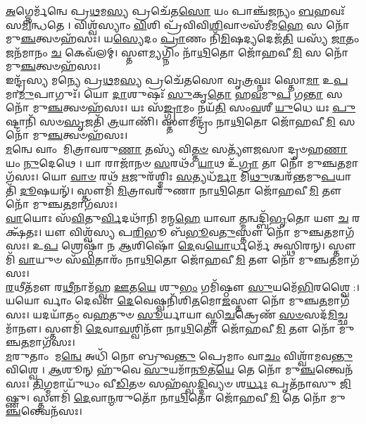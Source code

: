 \-\ul{𑌅}\-𑌗𑍍𑌨𑍇𑌰𑍍𑌮᳴𑌨𑍍𑌵𑍇 𑌪𑍍𑌰\-\ul{𑌥}\-𑌮\-\ul{𑌸𑍍𑌯} 𑌪𑍍𑌰𑌚𑍇᳴𑌤\-\ul{𑌸𑍋} 𑌯𑌂 𑌪𑌾𑌞𑍍𑌚᳴𑌜𑌨𑍍𑌯𑌂 \ul{𑌬}\-𑌹𑌵𑌃᳴ 𑌸\-\ul{𑌮𑌿}\-𑌨𑍍𑌧𑌤𑍇। 𑌵𑌿𑌶𑍍𑌵᳴𑌸𑍍𑌯𑌾𑌂 \ul{𑌵𑌿}\-𑌶𑌿 𑌪𑍍𑌰᳴𑌵𑌿𑌵𑌿\-\ul{𑌶𑌿}\-𑌵𑌾𑍞𑌸᳴𑌮𑍀𑌮\-\ul{𑌹𑍇} 𑌸 𑌨𑍋᳴ 𑌮𑍁\-\ul{𑌞𑍍𑌚}\-𑌤𑍍𑌵𑍞𑌹᳴𑌸𑌃। 𑌯\-\ul{𑌸𑍍𑌯𑍇}\-𑌦𑌂 \ul{𑌪𑍍𑌰𑌾}\-𑌣𑌂 𑌨𑌿᳴\-\ul{𑌮𑌿}\-𑌷𑌦𑍍𑌯𑌦𑍇𑌜᳴\-\ul{𑌤𑌿} 𑌯𑌸𑍍𑌯᳴ \ul{𑌜𑌾}\-𑌤𑌂 𑌜𑌨᳴𑌮𑌾𑌨𑌂 \ul{𑌚} 𑌕𑍇𑌵᳴𑌲𑌮𑍍। 𑌸𑍍𑌤𑍗\-\ul{𑌮𑍍𑌯}\-𑌗𑍍𑌨𑌿𑌂 𑌨𑌾᳴\-\ul{𑌥𑌿}\-𑌤𑍋 𑌜𑍋᳴𑌹𑌵𑍀\-\ul{𑌮𑌿} 𑌸 𑌨𑍋᳴ 𑌮𑍁\-\ul{𑌞𑍍𑌚}\-𑌤𑍍𑌵𑍞𑌹᳴𑌸𑌃।\\
𑌇𑌨𑍍𑌦𑍍𑌰᳴𑌸𑍍𑌯 𑌮𑌨𑍍𑌯𑍇 𑌪𑍍𑌰\-\ul{𑌥}\-𑌮\-\ul{𑌸𑍍𑌯} 𑌪𑍍𑌰𑌚𑍇᳴𑌤𑌸𑍋 𑌵𑍃\-\ul{𑌤𑍍𑌰}\-𑌘𑍍𑌨𑌃 𑌸𑍍𑌤𑍋\-\ul{𑌮𑌾} 𑌉\-\ul{𑌪} 𑌮𑌾\-\ul{𑌮𑍁}\-𑌪𑌾𑌗𑍁𑌃᳴। 𑌯𑍋 \ul{𑌦𑌾}\-𑌶𑍁𑌷𑌃᳴ \ul{𑌸𑍁}\-𑌕𑍃\-\ul{𑌤𑍋} 𑌹\-\ul{𑌵}\-𑌮𑍁\-\ul{𑌪} 𑌗\-\ul{𑌨𑍍𑌤𑌾} 𑌸 𑌨𑍋᳴ 𑌮𑍁\-\ul{𑌞𑍍𑌚}\-𑌤𑍍𑌵𑍞𑌹᳴𑌸𑌃। 𑌯𑌃 𑌸᳴\-\ul{𑌙𑍍𑌗𑍍𑌰𑌾}\-𑌮𑌂 𑌨𑌯᳴\-\ul{𑌤𑌿} 𑌸𑌂\-\ul{𑌵}\-𑌶𑍀 \ul{𑌯𑍁}\-𑌧𑍇 𑌯𑌃 \ul{𑌪𑍁}\-𑌷𑍍𑌟𑌾𑌨𑌿᳴ 𑌸𑍞\-\ul{𑌸𑍃}\-𑌜𑌤𑌿᳴ \ul{𑌤𑍍𑌰}\-𑌯𑌾𑌣𑌿᳴। 𑌸𑍍𑌤𑍗𑌮𑍀𑌨𑍍𑌦𑍍𑌰𑌂᳴ 𑌨𑌾\-\ul{𑌥𑌿}\-𑌤𑍋 𑌜𑍋᳴𑌹𑌵𑍀\-\ul{𑌮𑌿} 𑌸 𑌨𑍋᳴ 𑌮𑍁\-\ul{𑌞𑍍𑌚}\-𑌤𑍍𑌵𑍞𑌹᳴𑌸𑌃।\\
\-\ul{𑌮}\-𑌨𑍍𑌵𑍇 𑌵𑌾𑌂 𑌮𑌿𑌤𑍍𑌰𑌾𑌵𑌰𑍁\-\ul{𑌣𑌾} 𑌤𑌸𑍍𑌯᳴ 𑌵𑌿\-\ul{𑌤𑍍𑌤}\-\-\ul{𑍞} 𑌸𑌤𑍍𑌯𑍗᳴𑌜𑌸𑌾 𑌦𑍃𑍞𑌹\-\ul{𑌣𑌾} 𑌯𑌂 \ul{𑌨𑍁}\-𑌦𑍇𑌥𑍇। 𑌯𑌾 𑌰𑌾𑌜𑌾᳴𑌨𑍞 \ul{𑌸}\-𑌰𑌥𑌂᳴ \ul{𑌯𑌾}\-𑌥 𑌉᳴\-\ul{𑌗𑍍𑌰𑌾} 𑌤𑌾 𑌨𑍋᳴ 𑌮𑍁𑌞𑍍𑌚\-\ul{𑌤}\-𑌮𑌾𑌗᳴𑌸𑌃। 𑌯𑍋 \ul{𑌵𑌾}\-\-\ul{𑍞} 𑌰𑌥᳴ \ul{𑌋}\-𑌜𑍁𑌰᳴𑌶𑍍𑌮𑌿𑌃 \ul{𑌸}\-𑌤𑍍𑌯𑌧᳴\-\ul{𑌰𑍍𑌮𑌾} 𑌮𑌿\-\ul{𑌥𑍁}\-𑌶𑍍𑌚𑌰᳴𑌨𑍍𑌤𑌮𑍁\-\ul{𑌪}\-𑌯𑌾𑌤𑌿᳴ \ul{𑌦𑍂}\-𑌷𑌯𑌨𑍍᳴। 𑌸𑍍𑌤𑍗𑌮𑌿᳴ \ul{𑌮𑌿}\-𑌤𑍍𑌰𑌾𑌵𑌰𑍁᳴𑌣𑌾 𑌨𑌾\-\ul{𑌥𑌿}\-𑌤𑍋 𑌜𑍋᳴𑌹𑌵𑍀\-\ul{𑌮𑌿} 𑌤𑍗 𑌨𑍋᳴ 𑌮𑍁𑌞𑍍𑌚\-\ul{𑌤}\-𑌮𑌾𑌗᳴𑌸𑌃।\\
\-\ul{𑌵𑌾}\-𑌯𑍋𑌃 𑌸᳴\-\ul{𑌵𑌿}\-𑌤𑍁\-\ul{𑌰𑍍𑌵𑌿}\-𑌦𑌥𑌾᳴𑌨𑌿 𑌮𑌨𑍍𑌮\-\ul{𑌹𑍇} 𑌯𑌾𑌵𑌾\-\ul{𑌤𑍍𑌮}\-𑌨𑍍𑌵𑌦𑍍𑌬𑌿᳴\-\ul{𑌭𑍃}\-𑌤𑍋 𑌯𑍗 \ul{𑌚} 𑌰𑌕𑍍𑌷᳴𑌤𑌃। 𑌯𑍗 𑌵𑌿𑌶𑍍𑌵᳴𑌸𑍍𑌯 𑌪\-\ul{𑌰𑌿}\-𑌭𑍂 𑌬᳴\-\ul{𑌭𑍂}\-𑌵\-\ul{𑌤𑍁}\-𑌸𑍍𑌤𑍗 𑌨𑍋᳴ 𑌮𑍁𑌞𑍍𑌚\-\ul{𑌤}\-𑌮𑌾𑌗᳴𑌸𑌃। 𑌉\-\ul{𑌪} 𑌶𑍍𑌰𑍇𑌷𑍍𑌠𑌾᳴ 𑌨 \ul{𑌆}\-𑌶𑌿𑌷𑍋᳴ \ul{𑌦𑍇}\-𑌵\-\ul{𑌯𑍋}\-𑌰𑍍𑌧𑌰𑍍𑌮𑍇᳴ 𑌅𑌸𑍍𑌥𑌿𑌰𑌨𑍍। 𑌸𑍍𑌤𑍗𑌮𑌿᳴ \ul{𑌵𑌾}\-𑌯𑍁𑍞 𑌸᳴\-\ul{𑌵𑌿}\-𑌤𑌾𑌰𑌂᳴ 𑌨𑌾\-\ul{𑌥𑌿}\-𑌤𑍋 𑌜𑍋᳴𑌹𑌵𑍀\-\ul{𑌮𑌿} 𑌤𑍗 𑌨𑍋᳴ 𑌮𑍁𑌞𑍍𑌚\-\ul{𑌤}\-𑌮𑌾𑌗᳴𑌸𑌃।\\
\-\ul{𑌰}\-𑌥𑍀𑌤᳴𑌮𑍗 𑌰\-\ul{𑌥𑍀}\-𑌨𑌾𑌮᳴𑌹𑍍𑌵 \ul{𑌊}\-𑌤\-\ul{𑌯𑍇} 𑌶𑍁\-\ul{𑌭𑌂} 𑌗𑌮𑌿᳴𑌷𑍍𑌠𑍗 \ul{𑌸𑍁}\-𑌯𑌮𑍇᳴\-\ul{𑌭𑌿}\-𑌰𑌶𑍍𑌵𑍈:। 𑌯𑌯𑍋𑌰𑍍𑌵𑌾𑌂 𑌦𑍇𑌵𑍗 \ul{𑌦𑍇}\-𑌵𑍇𑌷𑍍𑌵𑌨𑌿᳴𑌶𑌿\-\ul{𑌤}\-𑌮𑍋\-\ul{𑌜}\-𑌸𑍍𑌤𑍗 𑌨𑍋᳴ 𑌮𑍁𑌞𑍍𑌚\-\ul{𑌤}\-𑌮𑌾𑌗᳴𑌸𑌃। 𑌯𑌦𑌯𑌾᳴𑌤𑌂 𑌵\-\ul{𑌹}\-𑌤𑍁𑍞 \ul{𑌸𑍂}\-𑌰𑍍𑌯𑌾𑌯𑌾𑌸𑍍𑌤𑍍𑌰𑌿\-\ul{𑌚}\-𑌕𑍍𑌰𑍇𑌣᳴ \ul{𑌸}\-\-\ul{𑍞}\-𑌸𑌦᳴\-\ul{𑌮𑌿}\-𑌚𑍍𑌛𑌮𑌾᳴𑌨𑍗। 𑌸𑍍𑌤𑍗𑌮𑌿᳴ \ul{𑌦𑍇}\-𑌵𑌾\-\ul{𑌵}\-𑌶𑍍𑌵𑌿𑌨𑍗᳴ 𑌨𑌾\-\ul{𑌥𑌿}\-𑌤𑍋 𑌜𑍋᳴𑌹𑌵𑍀\-\ul{𑌮𑌿} 𑌤𑍗 𑌨𑍋᳴ 𑌮𑍁𑌞𑍍𑌚\-\ul{𑌤}\-𑌮𑌾𑌗᳴𑌸𑌃।\\
\-\ul{𑌮}\-𑌰𑍁𑌤𑌾𑌂 𑌮\-\ul{𑌨𑍍𑌵𑍇} 𑌅𑌧𑌿᳴ 𑌨𑍋 𑌬𑍍𑌰𑍁𑌵\-\ul{𑌨𑍍𑌤𑍁} 𑌪𑍍𑌰𑍇𑌮𑌾𑌂 𑌵𑌾\-\ul{𑌚𑌂} 𑌵𑌿𑌶𑍍𑌵𑌾᳴𑌮𑌵\-\ul{𑌨𑍍𑌤𑍁} 𑌵𑌿𑌶𑍍𑌵𑍇। \ul{𑌆}\-𑌶𑍂𑌨𑍍 𑌹𑍁᳴𑌵𑍇 \ul{𑌸𑍁}\-𑌯𑌮𑌾᳴\-\ul{𑌨𑍂}\-𑌤\-\ul{𑌯𑍇} 𑌤𑍇 𑌨𑍋᳴ 𑌮𑍁\-\ul{𑌞𑍍𑌚}\-𑌨𑍍𑌤𑍍𑌵𑍇𑌨᳴𑌸𑌃। \ul{𑌤𑌿}\-𑌗𑍍𑌮𑌮𑌾𑌯𑍁᳴𑌧𑌂 𑌵𑍀\-\ul{𑌡𑌿}\-𑌤𑍞 𑌸𑌹᳴𑌸𑍍𑌵\-\ul{𑌦𑍍𑌦𑌿}\-𑌵𑍍𑌯𑍞 𑌶\-\ul{𑌰𑍍𑌧𑌃} 𑌪𑍃𑌤᳴𑌨𑌾𑌸𑍁 \ul{𑌜𑌿}\-𑌷𑍍𑌣𑍁। 𑌸𑍍𑌤𑍗𑌮𑌿᳴ \ul{𑌦𑍇}\-𑌵𑌾\-\ul{𑌨𑍍𑌮}\-𑌰𑍁𑌤𑍋᳴ 𑌨𑌾\-\ul{𑌥𑌿}\-𑌤𑍋 𑌜𑍋᳴𑌹𑌵𑍀\-\ul{𑌮𑌿} 𑌤𑍇 𑌨𑍋᳴ 𑌮𑍁\-\ul{𑌞𑍍𑌚}\-𑌨𑍍𑌤𑍍𑌵𑍇𑌨᳴𑌸𑌃।\\
